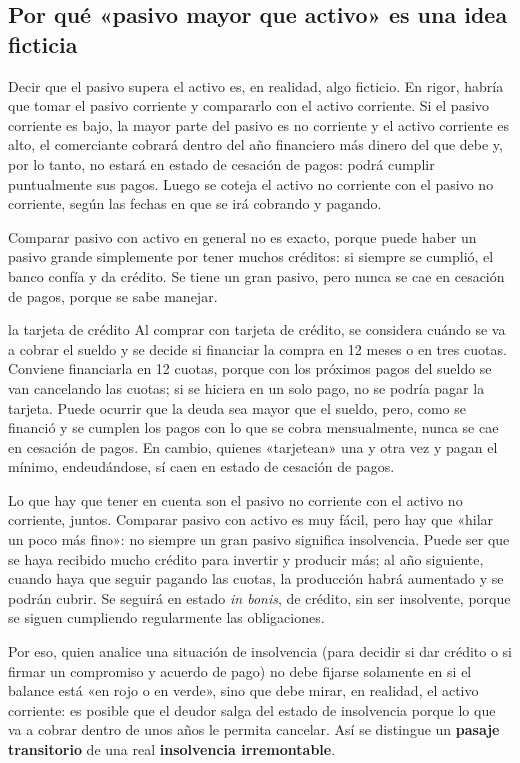 \documentclass[12pt,oneside]{book}
\begin{document}
\subsection{Por qué «pasivo mayor que activo» es una idea ficticia}

Decir que el pasivo supera el activo es, en realidad, algo ficticio. En rigor, habría que tomar el pasivo corriente y compararlo con el activo corriente. Si el pasivo corriente es bajo, la mayor parte del pasivo es no corriente y el activo corriente es alto, el comerciante cobrará dentro del año financiero más dinero del que debe y, por lo tanto, no estará en estado de cesación de pagos: podrá cumplir puntualmente sus pagos. Luego se coteja el activo no corriente con el pasivo no corriente, según las fechas en que se irá cobrando y pagando.

Comparar pasivo con activo en general no es exacto, porque puede haber un pasivo grande simplemente por tener muchos créditos: si siempre se cumplió, el banco confía y da crédito. Se tiene un gran pasivo, pero nunca se cae en cesación de pagos, porque se sabe manejar.

\begin{example}{la tarjeta de crédito}
Al comprar con tarjeta de crédito, se considera cuándo se va a cobrar el sueldo y se decide si financiar la compra en 12 meses o en tres cuotas. Conviene financiarla en 12 cuotas, porque con los próximos pagos del sueldo se van cancelando las cuotas; si se hiciera en un solo pago, no se podría pagar la tarjeta. Puede ocurrir que la deuda sea mayor que el sueldo, pero, como se financió y se cumplen los pagos con lo que se cobra mensualmente, nunca se cae en cesación de pagos. En cambio, quienes «tarjetean» una y otra vez y pagan el mínimo, endeudándose, sí caen en estado de cesación de pagos.
\end{example}

Lo que hay que tener en cuenta son el pasivo no corriente con el activo no corriente, juntos. Comparar pasivo con activo es muy fácil, pero hay que «hilar un poco más fino»: no siempre un gran pasivo significa insolvencia. Puede ser que se haya recibido mucho crédito para invertir y producir más; al año siguiente, cuando haya que seguir pagando las cuotas, la producción habrá aumentado y se podrán cubrir. Se seguirá en estado \textit{in bonis}, de crédito, sin ser insolvente, porque se siguen cumpliendo regularmente las obligaciones.

Por eso, quien analice una situación de insolvencia (para decidir si dar crédito o si firmar un compromiso y acuerdo de pago) no debe fijarse solamente en si el balance está «en rojo o en verde», sino que debe mirar, en realidad, el activo corriente: es posible que el deudor salga del estado de insolvencia porque lo que va a cobrar dentro de unos años le permita cancelar. Así se distingue un \textbf{pasaje transitorio} de una real \textbf{insolvencia irremontable}.
\end{document}
